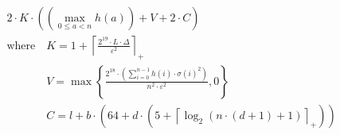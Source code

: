 \[\begin{aligned} &2 \cdot K \cdot \left(\left(\max_{0\le a<n} h\left(a\right)\right) + V + 2 \cdot C\right) \\ &\text{where}\quad K = 1 + \left\lceil \frac{2^{19} \cdot L \cdot \Delta}{\varepsilon^{2}} \right\rceil_{+} \\ &\phantom{\text{where}\quad} V = \max\left\{ \frac{2^{18} \cdot \left(\sum_{i=0}^{n-1} h\left(i\right) \cdot \sigma\left(i\right)^{2}\right)}{n^{2} \cdot \varepsilon^{2}}, 0 \right\} \\ &\phantom{\text{where}\quad} C = l + b \cdot \left(64 + d \cdot \left(5 + \left\lceil\log_{2}\left(n \cdot \left(d + 1\right) + 1\right)\right\rceil_{+}\right)\right)\end{aligned}\]
